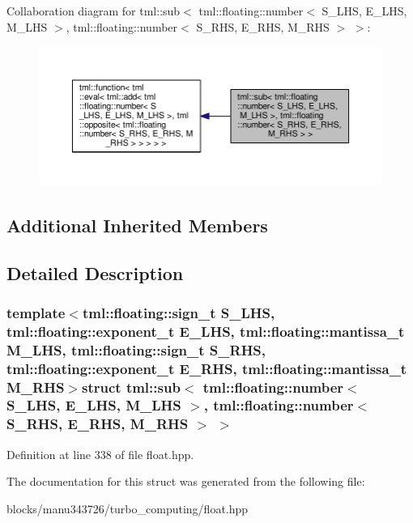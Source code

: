 Collaboration diagram for tml\+:\+:sub$<$ tml\+:\+:floating\+:\+:number$<$ S\+\_\+\+L\+H\+S, E\+\_\+\+L\+H\+S, M\+\_\+\+L\+H\+S $>$, tml\+:\+:floating\+:\+:number$<$ S\+\_\+\+R\+H\+S, E\+\_\+\+R\+H\+S, M\+\_\+\+R\+H\+S $>$ $>$\+:
\nopagebreak
\begin{figure}[H]
\begin{center}
\leavevmode
\includegraphics[width=350pt]{structtml_1_1sub_3_01tml_1_1floating_1_1number_3_01_s___l_h_s_00_01_e___l_h_s_00_01_m___l_h_s_01d4cfd572391f72120760c872781a22c0}
\end{center}
\end{figure}
\subsection*{Additional Inherited Members}


\subsection{Detailed Description}
\subsubsection*{template$<$tml\+::floating\+::sign\+\_\+t S\+\_\+\+L\+H\+S, tml\+::floating\+::exponent\+\_\+t E\+\_\+\+L\+H\+S, tml\+::floating\+::mantissa\+\_\+t M\+\_\+\+L\+H\+S, tml\+::floating\+::sign\+\_\+t S\+\_\+\+R\+H\+S, tml\+::floating\+::exponent\+\_\+t E\+\_\+\+R\+H\+S, tml\+::floating\+::mantissa\+\_\+t M\+\_\+\+R\+H\+S$>$struct tml\+::sub$<$ tml\+::floating\+::number$<$ S\+\_\+\+L\+H\+S, E\+\_\+\+L\+H\+S, M\+\_\+\+L\+H\+S $>$, tml\+::floating\+::number$<$ S\+\_\+\+R\+H\+S, E\+\_\+\+R\+H\+S, M\+\_\+\+R\+H\+S $>$ $>$}



Definition at line 338 of file float.\+hpp.



The documentation for this struct was generated from the following file\+:\begin{DoxyCompactItemize}
\item 
blocks/manu343726/turbo\+\_\+computing/float.\+hpp\end{DoxyCompactItemize}
